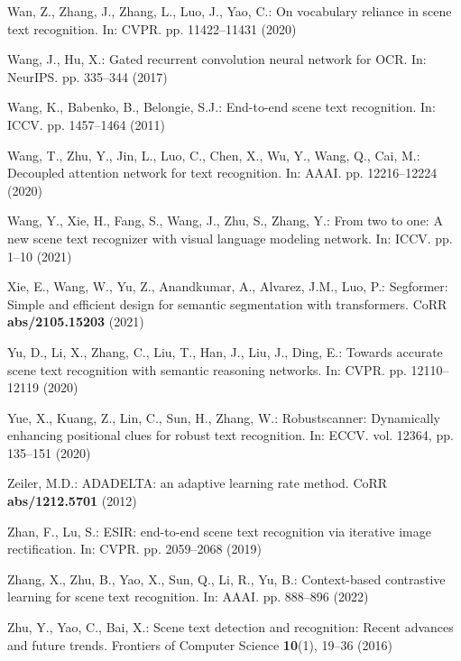 \documentclass[runningheads]{llncs}
\begin{document}
\begin{thebibliography}{10}
Wan, Z., Zhang, J., Zhang, L., Luo, J., Yao, C.: On vocabulary reliance in
  scene text recognition. In: CVPR. pp. 11422--11431 (2020)

Wang, J., Hu, X.: Gated recurrent convolution neural network for {OCR}. In:
  NeurIPS. pp. 335--344 (2017)

Wang, K., Babenko, B., Belongie, S.J.: End-to-end scene text recognition. In:
  ICCV. pp. 1457--1464 (2011)

Wang, T., Zhu, Y., Jin, L., Luo, C., Chen, X., Wu, Y., Wang, Q., Cai, M.:
  Decoupled attention network for text recognition. In: AAAI. pp. 12216--12224
  (2020)

Wang, Y., Xie, H., Fang, S., Wang, J., Zhu, S., Zhang, Y.: From two to one: {A}
  new scene text recognizer with visual language modeling network. In: ICCV.
  pp. 1--10 (2021)

Xie, E., Wang, W., Yu, Z., Anandkumar, A., Alvarez, J.M., Luo, P.: Segformer:
  Simple and efficient design for semantic segmentation with transformers. CoRR
   \textbf{abs/2105.15203} (2021)

Yu, D., Li, X., Zhang, C., Liu, T., Han, J., Liu, J., Ding, E.: Towards
  accurate scene text recognition with semantic reasoning networks. In: CVPR.
  pp. 12110--12119 (2020)

Yue, X., Kuang, Z., Lin, C., Sun, H., Zhang, W.: Robustscanner: Dynamically
  enhancing positional clues for robust text recognition. In: ECCV. vol. 12364,
  pp. 135--151 (2020)

Zeiler, M.D.: {ADADELTA:} an adaptive learning rate method. CoRR
  \textbf{abs/1212.5701} (2012)

Zhan, F., Lu, S.: {ESIR:} end-to-end scene text recognition via iterative image
  rectification. In: CVPR. pp. 2059--2068 (2019)

Zhang, X., Zhu, B., Yao, X., Sun, Q., Li, R., Yu, B.: Context-based contrastive
  learning for scene text recognition. In: AAAI. pp. 888--896 (2022)

Zhu, Y., Yao, C., Bai, X.: Scene text detection and recognition: Recent
  advances and future trends. Frontiers of Computer Science  \textbf{10}(1),
  19--36 (2016)

\end{thebibliography}
 
\end{document}
